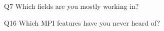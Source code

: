 \begin{description}%
\item{Q7} Which fields are you mostly working in?%
\item{Q16} Which MPI features have you never heard of?%
\end{description}%
